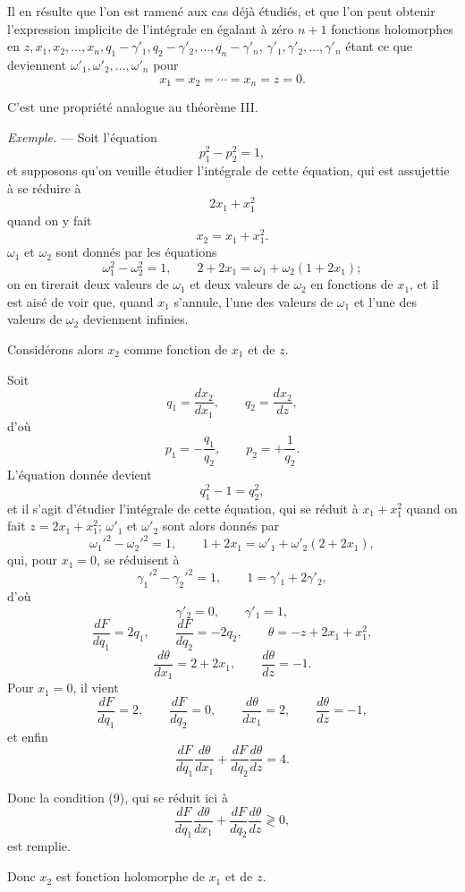 \documentclass[11pt]{article}
\begin{document}
Il en résulte que l’on est ramené aux cas déjà étudiés, et que l’on peut obtenir l’expression implicite de l’intégrale en égalant à zéro $n+1$ fonctions holomorphes en $z,x_1,x_2,\ldots,x_n,q_1-\gamma'_1,q_2-\gamma'_2,\ldots,q_n-\gamma'_n$, $\gamma'_1,\gamma'_2,\ldots,\gamma'_n$ étant ce que deviennent $\omega'_1,\omega'_2,\ldots,\omega'_n$ pour
\[
x_1=x_2=\cdots=x_n=z=0.
\]

C’est une propriété analogue au théorème III.

\emph{Exemple.} — Soit l’équation
\[
p_1^2-p_2^2=1,
\]
et supposons qu’on veuille étudier l’intégrale de cette équation, qui est assujettie à se réduire à
\[
2x_1+x_1^2
\]
quand on y fait
\[
x_2=x_1+x_1^2.
\]
$\omega_1$ et $\omega_2$ sont donnés par les équations
\[
\omega_1^2-\omega_2^2=1,\qquad
2+2x_1=\omega_1+\omega_2(1+2x_1);
\]
on en tirerait deux valeurs de $\omega_1$ et deux valeurs de $\omega_2$ en fonctions de $x_1$, et il est aisé de voir que, quand $x_1$ s’annule, l’une des valeurs de $\omega_1$ et l’une des valeurs de $\omega_2$ deviennent infinies.

Considérons alors $x_2$ comme fonction de $x_1$ et de $z$.

Soit
\[
q_1=\frac{dx_2}{dx_1},\qquad q_2=\frac{dx_2}{dz},
\]
d’où
\[
p_1=-\frac{q_1}{q_2},\qquad p_2=+\frac{1}{q_2}.
\]
L’équation donnée devient
\[
q_1^2-1=q_2^2,
\]
et il s’agit d’étudier l’intégrale de cette équation, qui se réduit à $x_1+x_1^2$ quand on fait $z=2x_1+x_1^2$; $\omega'_1$ et $\omega'_2$ sont alors donnés par
\[
\omega_1'^2-\omega_2'^2=1,\qquad
1+2x_1=\omega'_1+\omega'_2(2+2x_1),
\]
qui, pour $x_1=0$, se réduisent à
\[
\gamma_1'^2-\gamma_2'^2=1,\qquad 1=\gamma'_1+2\gamma'_2,
\]
d’où
\[
\gamma'_2=0,\qquad \gamma'_1=1,
\]
\[
\frac{dF}{dq_1}=2q_1,\qquad
\frac{dF}{dq_2}=-2q_2,\qquad
\theta=-z+2x_1+x_1^2,
\]
\[
\frac{d\theta}{dx_1}=2+2x_1,\qquad
\frac{d\theta}{dz}=-1.
\]
Pour $x_1=0$, il vient
\[
\frac{dF}{dq_1}=2,\qquad
\frac{dF}{dq_2}=0,\qquad
\frac{d\theta}{dx_1}=2,\qquad
\frac{d\theta}{dz}=-1,
\]
et enfin
\[
\frac{dF}{dq_1}\frac{d\theta}{dx_1}
+
\frac{dF}{dq_2}\frac{d\theta}{dz}=4.
\]

Donc la condition (9), qui se réduit ici à
\[
\frac{dF}{dq_1}\frac{d\theta}{dx_1}
+
\frac{dF}{dq_2}\frac{d\theta}{dz}\gtrless0,
\]
est remplie.

Donc $x_2$ est fonction holomorphe de $x_1$ et de $z$.
\end{document}
